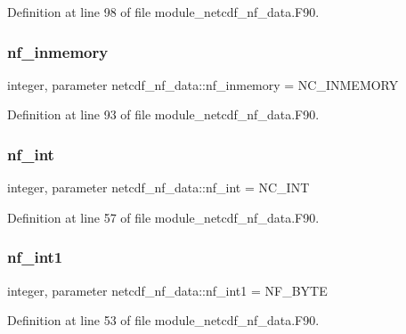 Definition at line 98 of file module\+\_\+netcdf\+\_\+nf\+\_\+data.\+F90.

\mbox{\label{namespacenetcdf__nf__data_ae1df4cb46d9c0b94386f1c6a32d57b76}} 
\subsubsection{\texorpdfstring{nf\+\_\+inmemory}{nf\_inmemory}}
{\footnotesize\ttfamily integer, parameter netcdf\+\_\+nf\+\_\+data\+::nf\+\_\+inmemory = N\+C\+\_\+\+I\+N\+M\+E\+M\+O\+RY}



Definition at line 93 of file module\+\_\+netcdf\+\_\+nf\+\_\+data.\+F90.

\mbox{\label{namespacenetcdf__nf__data_a8bf2bf336581ce0275f24b0d2174ee6d}} 
\subsubsection{\texorpdfstring{nf\+\_\+int}{nf\_int}}
{\footnotesize\ttfamily integer, parameter netcdf\+\_\+nf\+\_\+data\+::nf\+\_\+int = N\+C\+\_\+\+I\+NT}



Definition at line 57 of file module\+\_\+netcdf\+\_\+nf\+\_\+data.\+F90.

\mbox{\label{namespacenetcdf__nf__data_ad2132fc0056f1513a97f7c34f8b4b88d}} 
\subsubsection{\texorpdfstring{nf\+\_\+int1}{nf\_int1}}
{\footnotesize\ttfamily integer, parameter netcdf\+\_\+nf\+\_\+data\+::nf\+\_\+int1 = N\+F\+\_\+\+B\+Y\+TE}



Definition at line 53 of file module\+\_\+netcdf\+\_\+nf\+\_\+data.\+F90.

